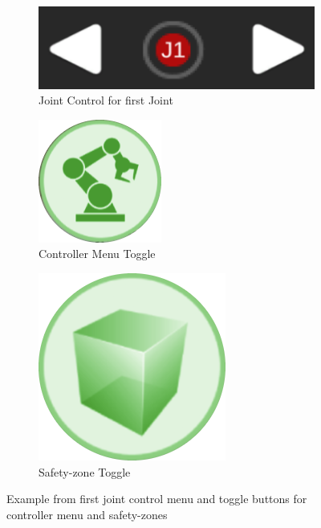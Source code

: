             
            \begin{figure}[h]
            \centering
            \begin{subfigure}[b]{0.31\textwidth}    
                \centering
                \includegraphics[width=1\linewidth]{figs/joint-1.png}
                \caption{Joint Control for first Joint}
                \label{fig:joint-1}
                \end{subfigure}
            \hfill %
            \begin{subfigure}[b]{0.31\textwidth}
                \centering
                \includegraphics[width=0.3\linewidth]{figs/clicked_joints.png}
                \caption{Controller Menu Toggle}
                \label{fig:toggle-joint}
            \end{subfigure}
            \hfill
            \begin{subfigure}[b]{0.31\textwidth}
                \centering
                \includegraphics[width=0.3\linewidth]{figs/unclick_sz.png}
                \caption{Safety-zone Toggle}
                \label{fig:toggle-safety}
            \end{subfigure}
            \caption{Example from first joint control menu and toggle buttons for controller menu and safety-zones}
            \label{fig:joint-toggle}
            \end{figure}
        
